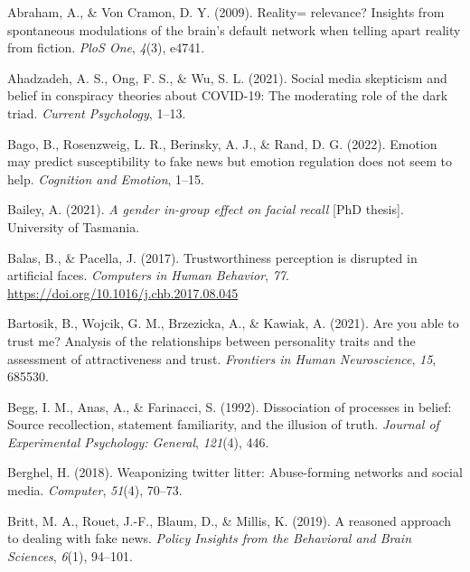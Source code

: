 \documentclass[
  man,floatsintext]{apa6}
\newlength{\cslhangindent}
\newlength{\cslentryspacingunit} %
\newenvironment{CSLReferences}[2] %
 {%
  \setlength{\parindent}{0pt}
  \ifodd #1
  \let\oldpar\par
  \def\par{\hangindent=\cslhangindent\oldpar}
  \fi
  \setlength{\parskip}{#2\cslentryspacingunit}
 }%
 {}
\begin{document}
\hypertarget{refs}{}
\begin{CSLReferences}{1}{0}
\leavevmode{}%
Abraham, A., \& Von Cramon, D. Y. (2009). Reality= relevance? Insights from spontaneous modulations of the brain's default network when telling apart reality from fiction. \emph{PloS One}, \emph{4}(3), e4741.

\leavevmode{}%
Ahadzadeh, A. S., Ong, F. S., \& Wu, S. L. (2021). Social media skepticism and belief in conspiracy theories about COVID-19: The moderating role of the dark triad. \emph{Current Psychology}, 1--13.

\leavevmode{}%
Bago, B., Rosenzweig, L. R., Berinsky, A. J., \& Rand, D. G. (2022). Emotion may predict susceptibility to fake news but emotion regulation does not seem to help. \emph{Cognition and Emotion}, 1--15.

\leavevmode{}%
Bailey, A. (2021). \emph{A gender in-group effect on facial recall} {[}PhD thesis{]}. University of Tasmania.

\leavevmode{}%
Balas, B., \& Pacella, J. (2017). Trustworthiness perception is disrupted in artificial faces. \emph{Computers in Human Behavior}, \emph{77}. \url{https://doi.org/10.1016/j.chb.2017.08.045}

\leavevmode{}%
Bartosik, B., Wojcik, G. M., Brzezicka, A., \& Kawiak, A. (2021). Are you able to trust me? Analysis of the relationships between personality traits and the assessment of attractiveness and trust. \emph{Frontiers in Human Neuroscience}, \emph{15}, 685530.

\leavevmode{}%
Begg, I. M., Anas, A., \& Farinacci, S. (1992). Dissociation of processes in belief: Source recollection, statement familiarity, and the illusion of truth. \emph{Journal of Experimental Psychology: General}, \emph{121}(4), 446.

\leavevmode{}%
Berghel, H. (2018). Weaponizing twitter litter: Abuse-forming networks and social media. \emph{Computer}, \emph{51}(4), 70--73.

\leavevmode{}%
Britt, M. A., Rouet, J.-F., Blaum, D., \& Millis, K. (2019). A reasoned approach to dealing with fake news. \emph{Policy Insights from the Behavioral and Brain Sciences}, \emph{6}(1), 94--101.


\end{CSLReferences}
\end{document}
